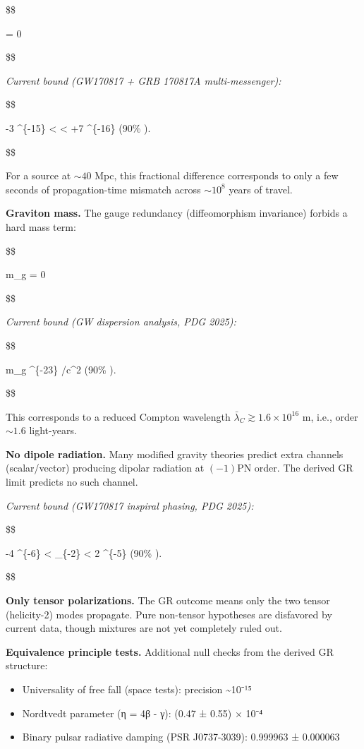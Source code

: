 \documentclass[11pt,a4paper]{article}
\theoremstyle{remark}
\providecommand{\tightlist}{%
  \setlength{\itemsep}{0pt}\setlength{\parskip}{0pt}}
\begin{document}
\$\$

 = 0 

\$\$

\emph{Current bound (GW170817 + GRB 170817A multi-messenger):}

\$\$

-3 \^{}\{-15\} \textless{}  \textless{} +7 \^{}\{-16\}
\quad (90\% ).

\$\$

For a source at \(\sim 40\) Mpc, this fractional difference corresponds to only
a few seconds of propagation-time mismatch across \(\sim 10^8\) years of travel.

\textbf{Graviton mass.} The gauge redundancy (diffeomorphism invariance) forbids a
hard mass term:

\$\$

m\_g = 0 

\$\$

\emph{Current bound (GW dispersion analysis, PDG 2025):}

\$\$

m\_g  \^{}\{-23\} /c\^{}2 \quad (90\% ).

\$\$

This corresponds to a reduced Compton wavelength
\(\bar{\lambda}_C \gtrsim 1.6 \times 10^{16}\) m, i.e., order \(\sim 1.6\)
light-years.

\textbf{No dipole radiation.} Many modified gravity theories predict extra channels
(scalar/vector) producing dipolar radiation at \((-1)\)PN order. The derived GR
limit predicts no such channel.

\emph{Current bound (GW170817 inspiral phasing, PDG 2025):}

\$\$

-4 \^{}\{-6\} \textless{} \delta{}\_\{-2\} \textless{} 2 \^{}\{-5\}
\quad (90\% ).

\$\$

\textbf{Only tensor polarizations.} The GR outcome means only the two tensor
(helicity-2) modes propagate. Pure non-tensor hypotheses are disfavored by
current data, though mixtures are not yet completely ruled out.

\textbf{Equivalence principle tests.} Additional null checks from the derived GR
structure:

\begin{itemize}
\tightlist
\item
  Universality of free fall (space tests): precision \textasciitilde10⁻¹⁵
\item
  Nordtvedt parameter (η = 4β - γ): (0.47 ± 0.55) × 10⁻⁴
\item
  Binary pulsar radiative damping (PSR J0737-3039): 0.999963 ± 0.000063
\end{itemize}
\end{document}
